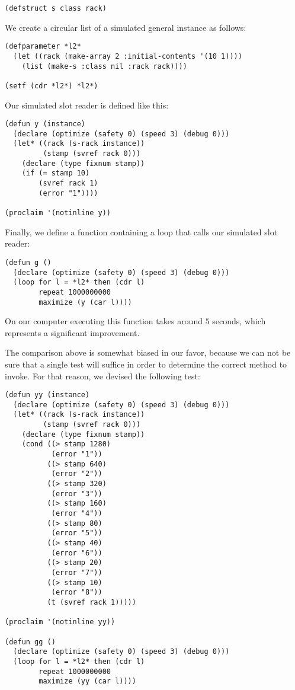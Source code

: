 \begin{verbatim}
(defstruct s class rack)
\end{verbatim}

We create a circular list of a simulated general instance as follows:

\begin{verbatim}
(defparameter *l2* 
  (let ((rack (make-array 2 :initial-contents '(10 1))))
    (list (make-s :class nil :rack rack))))

(setf (cdr *l2*) *l2*)
\end{verbatim}

Our simulated slot reader is defined like this:

\begin{verbatim}
(defun y (instance)
  (declare (optimize (safety 0) (speed 3) (debug 0)))
  (let* ((rack (s-rack instance))
         (stamp (svref rack 0)))
    (declare (type fixnum stamp))
    (if (= stamp 10)
        (svref rack 1)
        (error "1"))))

(proclaim '(notinline y))
\end{verbatim}

Finally, we define a function containing a loop that calls our
simulated slot reader:

\begin{verbatim}
(defun g ()
  (declare (optimize (safety 0) (speed 3) (debug 0)))
  (loop for l = *l2* then (cdr l)
        repeat 1000000000
        maximize (y (car l))))
\end{verbatim}

On our computer executing this function takes around $5$ seconds,
which represents a significant improvement.

The comparison above is somewhat biased in our favor, because we can
not be sure that a single test will suffice in order to determine the
correct method to invoke.  For that reason, we devised the following
test: 

\begin{verbatim}
(defun yy (instance)
  (declare (optimize (safety 0) (speed 3) (debug 0)))
  (let* ((rack (s-rack instance))
         (stamp (svref rack 0)))
    (declare (type fixnum stamp))
    (cond ((> stamp 1280)
           (error "1"))
          ((> stamp 640)
           (error "2"))
          ((> stamp 320)
           (error "3"))
          ((> stamp 160)
           (error "4"))
          ((> stamp 80)
           (error "5"))
          ((> stamp 40)
           (error "6"))
          ((> stamp 20)
           (error "7"))
          ((> stamp 10)
           (error "8"))
          (t (svref rack 1)))))

(proclaim '(notinline yy))

(defun gg ()
  (declare (optimize (safety 0) (speed 3) (debug 0)))
  (loop for l = *l2* then (cdr l)
        repeat 1000000000
        maximize (yy (car l))))
\end{verbatim}

